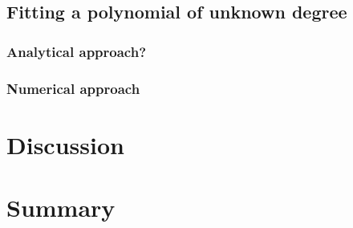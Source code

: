 \documentclass[%
 reprint,
 amsmath,amssymb,
 aps,
]{revtex4-1}
\begin{document}
\subsection{Fitting a polynomial of unknown degree}
\subsubsection{Analytical approach?}
\subsubsection{Numerical approach}

\section{Discussion}

\section{Summary}



\end{document}
